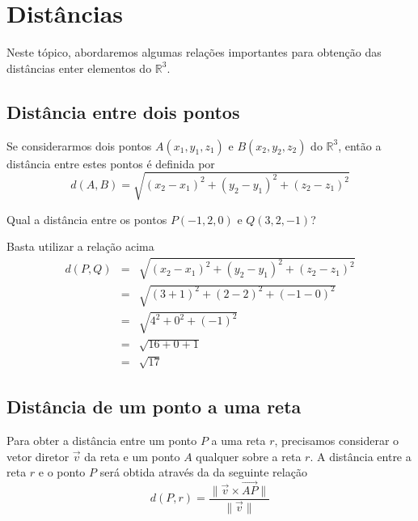 \chapter{Distâncias}

Neste tópico, abordaremos algumas relações importantes para obtenção das distâncias enter elementos do $\mathbb{R}^3$.

\section{Distância entre dois pontos}

Se considerarmos dois pontos $A(x_1, y_1, z_1)$ e $B(x_2, y_2, z_2)$ do $\mathbb{R}^3$, então a distância entre estes pontos é definida por
\begin{equation}
d(A, B)=\sqrt{(x_2-x_1)^2+(y_2-y_1)^2+(z_2-z_1)^2}
\end{equation}

\begin{exemplo} Qual a distância entre os pontos $P(-1, 2, 0)$ e $Q(3, 2, -1)$?

Basta utilizar a relação acima
\begin{eqnarray*}
d(P, Q)   & = & \sqrt{(x_2-x_1)^2+(y_2-y_1)^2+(z_2-z_1)^2} \\
          & = &  \sqrt{(3+1)^2+(2-2)^2+(-1-0)^2} \\
          & = &  \sqrt{4^2+0^2+(-1)^2} \\
          & = &  \sqrt{16+0+1} \\
          & = & \sqrt{17}
\end{eqnarray*}

\end{exemplo}

\section{Distância de um ponto a uma reta}

Para obter a distância entre um ponto $P$ a uma reta $r$, precisamos considerar o vetor diretor $\vec{v}$ da reta e um ponto $A$ qualquer sobre a reta $r$. A distância entre a reta $r$ e o ponto $P$ será obtida através da da seguinte relação
\begin{equation} 
d(P, r)=\frac{\|\vec{v}\times \overrightarrow{AP}\|}{\|\vec{v}\|}
\label{distpr}
\end{equation}


